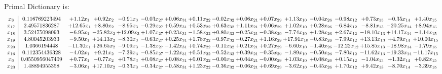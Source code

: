 \documentclass[9pt]{article}
\begin{document}
Primal Dictionary is:
\[\begin{array}{c| c c@{\hskip 2pt} c@{\hskip 2pt} c@{\hskip 2pt} c@{\hskip 2pt} c@{\hskip 2pt} c@{\hskip 2pt} c@{\hskip 2pt} c@{\hskip 2pt} c@{\hskip 2pt} c@{\hskip 2pt} c@{\hskip 2pt} c@{\hskip 2pt} c@{\hskip 2pt} c@{\hskip 2pt} c@{\hskip 2pt} }
 x_{8}   &  0.116769223494 & +  1.12 x_{1} & +  0.92 x_{2} & -0.91 x_{3} & -0.03 x_{27} & +  0.06 x_{31} & +  0.11 x_{22} & -0.02 x_{32} & +  0.06 x_{21} & +  0.07 x_{29} & +  1.13 x_{10} & -0.04 x_{26} & -0.98 x_{12} & +  0.73 x_{13} & -0.35 x_{14} & +  1.40 x_{15}\\
 x_{17}   &  2.49571836287 & + 12.65 x_{1} & +  8.80 x_{2} & -8.95 x_{3} & -0.29 x_{27} & +  0.59 x_{31} & +  0.53 x_{22} & +  0.63 x_{32} & +  1.11 x_{21} & +  0.06 x_{29} & +  1.02 x_{10} & +  0.28 x_{26} & -6.84 x_{12} & -8.81 x_{13} & -20.25 x_{14} & +  8.94 x_{15}\\
 x_{18}   &  3.52475098093 & -6.95 x_{1} & -25.82 x_{2} & + 12.09 x_{3} & +  1.07 x_{27} & +  0.23 x_{31} & -1.58 x_{22} & +  0.80 x_{32} & -0.25 x_{21} & -0.38 x_{29} & -7.74 x_{10} & +  1.28 x_{26} & +  2.67 x_{12} & -18.10 x_{13} & + 14.17 x_{14} & -1.14 x_{15}\\
 x_{19}   &  4.80045203933 & -9.50 x_{1} & + 14.13 x_{2} & -8.30 x_{3} & -0.63 x_{27} & +  0.25 x_{31} & +  1.78 x_{22} & -0.97 x_{32} & -0.27 x_{21} & +  1.16 x_{29} & + 17.91 x_{10} & -0.83 x_{26} & -7.99 x_{12} & + 13.13 x_{13} & +  4.79 x_{14} & + 10.00 x_{15}\\
 x_{20}   &  1.0366194448 & -11.30 x_{1} & + 26.65 x_{2} & -9.09 x_{3} & -1.38 x_{27} & -1.42 x_{31} & +  0.74 x_{22} & -0.11 x_{32} & +  0.21 x_{21} & +  0.27 x_{29} & -6.60 x_{10} & -1.40 x_{26} & -12.22 x_{12} & + 15.85 x_{13} & -18.98 x_{14} & -1.79 x_{15}\\
 x_{16}   &  0.112354436328 & -4.02 x_{1} & +  9.21 x_{2} & -7.39 x_{3} & -0.85 x_{27} & -1.22 x_{31} & +  0.51 x_{22} & -0.52 x_{32} & +  0.39 x_{21} & -0.35 x_{29} & -1.89 x_{10} & -0.50 x_{26} & -7.80 x_{12} & -11.62 x_{13} & -19.33 x_{14} & -11.17 x_{15}\\
 x_{6}   &  0.0550956047409 & +  0.77 x_{1} & -0.77 x_{2} & +  0.78 x_{3} & +  0.08 x_{27} & +  0.08 x_{31} & +  0.01 x_{22} & -0.00 x_{32} & +  0.04 x_{21} & -0.00 x_{29} & +  1.03 x_{10} & +  0.08 x_{26} & +  0.15 x_{12} & -1.04 x_{13} & +  1.32 x_{14} & +  0.82 x_{15}\\
 x_{23}   &  1.48894955358 & -3.06 x_{1} & + 17.10 x_{2} & -0.33 x_{3} & -0.34 x_{27} & -0.58 x_{31} & +  1.23 x_{22} & -0.36 x_{32} & -0.06 x_{21} & +  0.69 x_{29} & -3.62 x_{10} & -0.45 x_{26} & +  1.70 x_{12} & +  9.42 x_{13} & -8.70 x_{14} & -3.39 x_{15}\\

\end{array}\]
\end{document}

